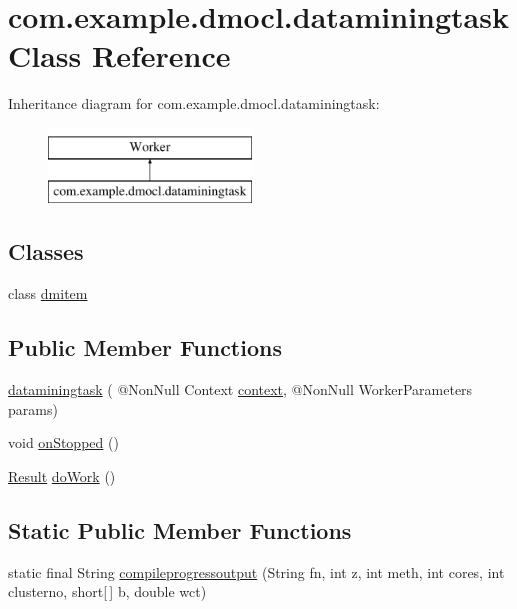 \hypertarget{classcom_1_1example_1_1dmocl_1_1dataminingtask}{}\section{com.\+example.\+dmocl.\+dataminingtask Class Reference}
\label{classcom_1_1example_1_1dmocl_1_1dataminingtask}
Inheritance diagram for com.\+example.\+dmocl.\+dataminingtask\+:\begin{figure}[H]
\begin{center}
\leavevmode
\includegraphics[height=2.000000cm]{classcom_1_1example_1_1dmocl_1_1dataminingtask}
\end{center}
\end{figure}
\subsection*{Classes}
\begin{DoxyCompactItemize}
\item 
class \mbox{\hyperlink{classcom_1_1example_1_1dmocl_1_1dataminingtask_1_1dmitem}{dmitem}}
\end{DoxyCompactItemize}
\subsection*{Public Member Functions}
\begin{DoxyCompactItemize}
\item 
\mbox{\hyperlink{classcom_1_1example_1_1dmocl_1_1dataminingtask_adeb6d5795db66ea5aa050d442ad17959}{dataminingtask}} ( @Non\+Null Context \mbox{\hyperlink{classcom_1_1example_1_1dmocl_1_1dataminingtask_af92eb0e81bab3e6a23945fb18165b423}{context}}, @Non\+Null Worker\+Parameters params)
\item 
void \mbox{\hyperlink{classcom_1_1example_1_1dmocl_1_1dataminingtask_a3ae06bc9b4443444284c6339c81252c4}{on\+Stopped}} ()
\item 
\mbox{\hyperlink{classcom_1_1example_1_1dmocl_1_1Result}{Result}} \mbox{\hyperlink{classcom_1_1example_1_1dmocl_1_1dataminingtask_a39b5d15f90cab9ac6ce6f0d4d4797261}{do\+Work}} ()
\end{DoxyCompactItemize}
\subsection*{Static Public Member Functions}
\begin{DoxyCompactItemize}
\item 
static final String \mbox{\hyperlink{classcom_1_1example_1_1dmocl_1_1dataminingtask_adbc8fcc905465705753dec21be6e9b9f}{compileprogressoutput}} (String fn, int z, int meth, int cores, int clusterno, short\mbox{[}$\,$\mbox{]} b, double wct)
\end{DoxyCompactItemize}
